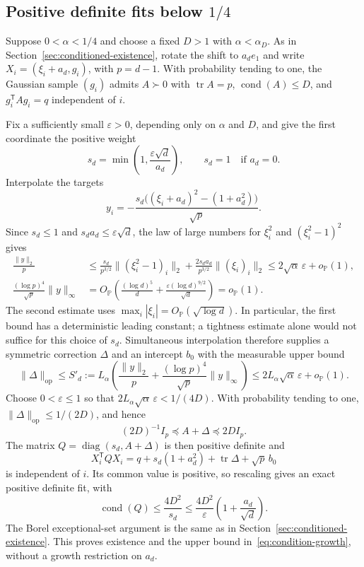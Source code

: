 \documentclass[11pt]{article}
\newcommand{\Pbb}{\mathbb P}
\DeclareMathOperator{\tr}{tr}
\DeclareMathOperator{\cond}{cond}
\newcommand{\opnorm}[1]{\lVert#1\rVert_{\mathrm{op}}}
\newcommand{\norm}[1]{\lVert#1\rVert}
\newcommand{\OP}{O_{\Pbb}}
\newcommand{\oP}{o_{\Pbb}}
\theoremstyle{remark}
\begin{document}
\subsection{Positive definite fits below \texorpdfstring{$1/4$}{1/4}}

Suppose $0<\alpha<1/4$ and choose a fixed $D>1$ with
$\alpha<\alpha_D$. As in Section~\ref{sec:conditioned-existence}, rotate
the shift to $a_de_1$ and write $X_i=(\xi_i+a_d,g_i)$, with $p=d-1$.
With probability tending to one, the Gaussian sample $(g_i)$ admits
$A\succ0$ with $\tr A=p$, $\cond(A)\le D$, and
$g_i^{\mathsf T}Ag_i=q$ independent of $i$.

Fix a sufficiently small $\varepsilon>0$, depending only on $\alpha$
and $D$, and give the first coordinate the positive weight
\[
 s_d=\min\left(1,\frac{\varepsilon\sqrt d}{a_d}\right),
 \qquad s_d=1\quad\text{if }a_d=0.
\]
Interpolate the targets
\[
 y_i=-\frac{s_d\big((\xi_i+a_d)^2-(1+a_d^2)\big)}{\sqrt p}.
\]
Since $s_d\le1$ and $s_da_d\le\varepsilon\sqrt d$, the law of large
numbers for $\xi_i^2$ and $(\xi_i^2-1)^2$ gives
\begin{align}
 \frac{\norm y_2}{p}
 &\le\frac{s_d}{p^{3/2}}\norm{(\xi_i^2-1)_i}_2
       +\frac{2s_da_d}{p^{3/2}}\norm{(\xi_i)_i}_2
 \le2\sqrt\alpha\,\varepsilon+\oP(1),
       \label{eq:weighted-target-l2}\\
 \frac{(\log p)^4}{\sqrt p}\norm y_\infty
 &=\OP\left(\frac{(\log d)^5}{d}
       +\frac{\varepsilon(\log d)^{9/2}}{\sqrt d}\right)=\oP(1).
       \label{eq:weighted-target-infinity}
\end{align}
The second estimate uses $\max_i|\xi_i|=\OP(\sqrt{\log d})$.
In particular, the first bound has a deterministic leading constant;
a tightness estimate alone would not suffice for this choice of $s_d$.
Simultaneous interpolation therefore supplies a symmetric correction
$\Delta$ and an intercept $b_0$ with the measurable upper bound
\[
 \opnorm\Delta\le S'_d:=L_\alpha\left(
 \frac{\norm y_2}{p}+\frac{(\log p)^4}{\sqrt p}\norm y_\infty\right)
 \le2L_\alpha\sqrt\alpha\,\varepsilon+\oP(1).
\]
Choose $0<\varepsilon\le1$ so that
$2L_\alpha\sqrt\alpha\,\varepsilon<1/(4D)$. With probability tending
to one, $\opnorm\Delta\le1/(2D)$, and hence
\[
 (2D)^{-1}I_p\preceq A+\Delta\preceq2D I_p.
\]
The matrix
$Q=\operatorname{diag}(s_d,A+\Delta)$ is then positive definite and
\[
 X_i^{\mathsf T}QX_i
 =q+s_d(1+a_d^2)+\tr\Delta+\sqrt p\,b_0
\]
is independent of $i$. Its common value is positive, so rescaling gives
an exact positive definite fit, with
\begin{equation}\label{eq:weighted-condition-upper}
 \cond(Q)\le\frac{4D^2}{s_d}
 \le\frac{4D^2}{\varepsilon}\left(1+\frac{a_d}{\sqrt d}\right).
\end{equation}
The Borel exceptional-set argument is the same as in
Section~\ref{sec:conditioned-existence}. This proves existence and the
upper bound in~\eqref{eq:condition-growth}, without a growth restriction
on $a_d$.
\end{document}
